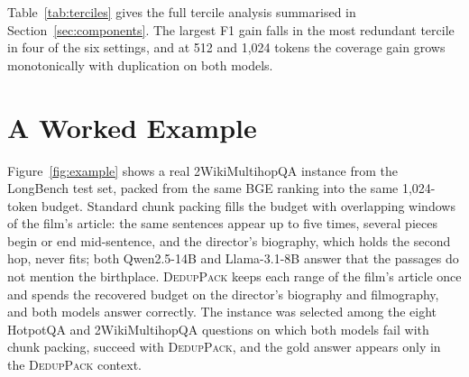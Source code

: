 \documentclass[11pt]{article}
\newcommand{\spk}{\textsc{DedupPack}}
\begin{document}
\begin{table}[t]
\centering
\small
\setlength{\tabcolsep}{3pt}
\caption{Gain of \spk{} over chunk packing (same BGE ranking) by tercile of the duplication rate of the chunk-packed context: F1 gain / answer-coverage gain, in points. Mean duplication in the three terciles: about 0/15/30\% at 512, 10/23/36\% at 1,024 and 18/30/40\% at 2,048 tokens.}
\label{tab:terciles}
\end{table}

Table~\ref{tab:terciles} gives the full tercile analysis summarised in Section~\ref{sec:components}. The largest F1 gain falls in the most redundant tercile in four of the six settings, and at 512 and 1,024 tokens the coverage gain grows monotonically with duplication on both models.

\section{A Worked Example}
\label{app:example}
Figure~\ref{fig:example} shows a real 2WikiMultihopQA instance from the LongBench test set, packed from the same BGE ranking into the same 1,024-token budget. Standard chunk packing fills the budget with overlapping windows of the film's article: the same sentences appear up to five times, several pieces begin or end mid-sentence, and the director's biography, which holds the second hop, never fits; both Qwen2.5-14B and Llama-3.1-8B answer that the passages do not mention the birthplace. \spk{} keeps each range of the film's article once and spends the recovered budget on the director's biography and filmography, and both models answer correctly. The instance was selected among the eight HotpotQA and 2WikiMultihopQA questions on which both models fail with chunk packing, succeed with \spk{}, and the gold answer appears only in the \spk{} context.
\end{document}
